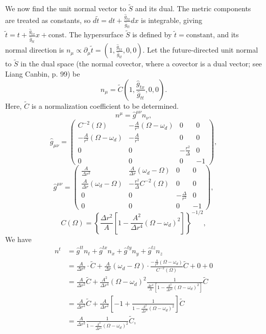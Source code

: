 \documentclass[english]{article}
\begin{document}
We now find the unit normal vector to $\tilde{S}$ and its dual. The
metric components are treated as constants, so $d\tilde{t}=dt+\frac{\hat{g}_{tx}}{\hat{g}_{tt}}dx$
is integrable, giving $\tilde{t}=t+\frac{\hat{g}_{tx}}{\hat{g}_{tt}}x+\text{const}$.
The hypersurface $\tilde{S}$ is defined by $\tilde{t}=\text{constant}$,
and its normal direction is $n_{\mu}\propto\partial_{\mu}\tilde{t}=\left(1,\frac{\hat{g}_{tx}}{\hat{g}_{tt}},0,0\right)$.
Let the future-directed unit normal to $\tilde{S}$ in the dual space
(the normal covector, where a covector is a dual vector; see Liang
Canbin, p. 99) be 
\[
n_{\mu}=\tilde{C}\left(1,\frac{\hat{g}_{tx}}{\hat{g}_{tt}},0,0\right).
\]
 Here, $\tilde{C}$ is a normalization coefficient to be determined.
\[
n^{\mu}=\hat{g}^{\mu\nu}n_{\nu},
\]
 {}
\[
\hat{g}_{\mu\nu}=\begin{pmatrix}C^{-2}\left(\Omega\right) & -\frac{A}{r^{3}}\left(\Omega-\omega_{d}\right) & 0 & 0\\
-\frac{A}{r^{3}}\left(\Omega-\omega_{d}\right) & -\frac{A}{r^{4}} & 0 & 0\\
0 & 0 & -\frac{r^{2}}{\Delta} & 0\\
0 & 0 & 0 & -1
\end{pmatrix},
\]
 {}
\[
\hat{g}^{\mu\nu}=\begin{pmatrix}\frac{A}{\Delta r^{2}} & \frac{A}{\Delta r}\left(\omega_{d}-\Omega\right) & 0 & 0\\
\frac{A}{\Delta r}\left(\omega_{d}-\Omega\right) & -\frac{r^{2}}{\Delta}C^{-2}\left(\Omega\right) & 0 & 0\\
0 & 0 & -\frac{\Delta}{r^{2}} & 0\\
0 & 0 & 0 & -1
\end{pmatrix},
\]
 {}
\[
C\left(\Omega\right)=\left\{ \frac{\Delta r^{2}}{A}\left[1-\frac{A^{2}}{\Delta r^{4}}\left(\Omega-\omega_{d}\right)^{2}\right]\right\} ^{-1/2},
\]
 We have 
\begin{align*}
n^{t} & =\hat{g}^{tt}n_{t}+\hat{g}^{tx}n_{x}+\hat{g}^{ty}n_{y}+\hat{g}^{tz}n_{z}\\
 & =\frac{A}{\Delta r^{2}}\cdot\tilde{C}+\frac{A}{\Delta r}\left(\omega_{d}-\Omega\right)\cdot\frac{-\frac{A}{r^{3}}\left(\Omega-\omega_{d}\right)}{C^{-2}\left(\Omega\right)}\tilde{C}+0+0\\
 & =\frac{A}{\Delta r^{2}}\tilde{C}+\frac{A^{2}}{\Delta r^{4}}\left(\Omega-\omega_{d}\right)^{2}\frac{1}{\frac{\Delta r^{2}}{A}\left[1-\frac{A^{2}}{\Delta r^{4}}\left(\Omega-\omega_{d}\right)^{2}\right]}\tilde{C}\\
 & =\frac{A}{\Delta r^{2}}\tilde{C}+\frac{A}{\Delta r^{2}}\left[-1+\frac{1}{1-\frac{A^{2}}{\Delta r^{4}}\left(\Omega-\omega_{d}\right)^{2}}\right]\tilde{C}\\
 & =\frac{A}{\Delta r^{2}}\frac{1}{1-\frac{A^{2}}{\Delta r^{4}}\left(\Omega-\omega_{d}\right)^{2}}\tilde{C},
\end{align*}
\end{document}
